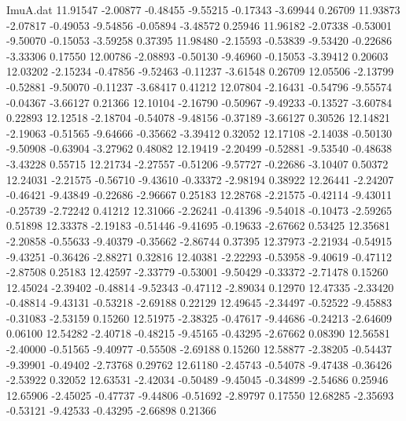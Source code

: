 \begin{filecontents}{ImuA.dat}
  11.91547   -2.00877   -0.48455   -9.55215   -0.17343   -3.69944    0.26709
  11.93873   -2.07817   -0.49053   -9.54856   -0.05894   -3.48572    0.25946
  11.96182   -2.07338   -0.53001   -9.50070   -0.15053   -3.59258    0.37395
  11.98480   -2.15593   -0.53839   -9.53420   -0.22686   -3.33306    0.17550
  12.00786   -2.08893   -0.50130   -9.46960   -0.15053   -3.39412    0.20603
  12.03202   -2.15234   -0.47856   -9.52463   -0.11237   -3.61548    0.26709
  12.05506   -2.13799   -0.52881   -9.50070   -0.11237   -3.68417    0.41212
  12.07804   -2.16431   -0.54796   -9.55574   -0.04367   -3.66127    0.21366
  12.10104   -2.16790   -0.50967   -9.49233   -0.13527   -3.60784    0.22893
  12.12518   -2.18704   -0.54078   -9.48156   -0.37189   -3.66127    0.30526
  12.14821   -2.19063   -0.51565   -9.64666   -0.35662   -3.39412    0.32052
  12.17108   -2.14038   -0.50130   -9.50908   -0.63904   -3.27962    0.48082
  12.19419   -2.20499   -0.52881   -9.53540   -0.48638   -3.43228    0.55715
  12.21734   -2.27557   -0.51206   -9.57727   -0.22686   -3.10407    0.50372
  12.24031   -2.21575   -0.56710   -9.43610   -0.33372   -2.98194    0.38922
  12.26441   -2.24207   -0.46421   -9.43849   -0.22686   -2.96667    0.25183
  12.28768   -2.21575   -0.42114   -9.43011   -0.25739   -2.72242    0.41212
  12.31066   -2.26241   -0.41396   -9.54018   -0.10473   -2.59265    0.51898
  12.33378   -2.19183   -0.51446   -9.41695   -0.19633   -2.67662    0.53425
  12.35681   -2.20858   -0.55633   -9.40379   -0.35662   -2.86744    0.37395
  12.37973   -2.21934   -0.54915   -9.43251   -0.36426   -2.88271    0.32816
  12.40381   -2.22293   -0.53958   -9.40619   -0.47112   -2.87508    0.25183
  12.42597   -2.33779   -0.53001   -9.50429   -0.33372   -2.71478    0.15260
  12.45024   -2.39402   -0.48814   -9.52343   -0.47112   -2.89034    0.12970
  12.47335   -2.33420   -0.48814   -9.43131   -0.53218   -2.69188    0.22129
  12.49645   -2.34497   -0.52522   -9.45883   -0.31083   -2.53159    0.15260
  12.51975   -2.38325   -0.47617   -9.44686   -0.24213   -2.64609    0.06100
  12.54282   -2.40718   -0.48215   -9.45165   -0.43295   -2.67662    0.08390
  12.56581   -2.40000   -0.51565   -9.40977   -0.55508   -2.69188    0.15260
  12.58877   -2.38205   -0.54437   -9.39901   -0.49402   -2.73768    0.29762
  12.61180   -2.45743   -0.54078   -9.47438   -0.36426   -2.53922    0.32052
  12.63531   -2.42034   -0.50489   -9.45045   -0.34899   -2.54686    0.25946
  12.65906   -2.45025   -0.47737   -9.44806   -0.51692   -2.89797    0.17550
  12.68285   -2.35693   -0.53121   -9.42533   -0.43295   -2.66898    0.21366

\end{filecontents}
